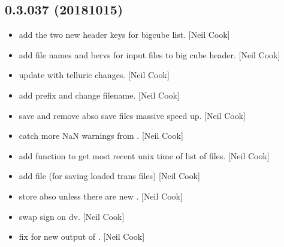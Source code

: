 \documentclass[a4paper,10pt,english]{report}
\begin{document}
\subsection{0.3.037 (2018\sphinxhyphen{}10\sphinxhyphen{}15)}
\label{\detokenize{misc/changelog:id313}}\begin{itemize}
\item {} 
 \sphinxhyphen{} add the two new header keys for bigcube list.
{[}Neil Cook{]}

\item {} 
 \sphinxhyphen{} add file names and bervs for input files to
big cube header. {[}Neil Cook{]}

\item {} 
 \sphinxhyphen{} update with telluric changes. {[}Neil Cook{]}

\item {} 
 \sphinxhyphen{} add prefix and change filename. {[}Neil Cook{]}

\item {} 
 \sphinxhyphen{} save and remove abso save files \sphinxhyphen{} massive speed up.
{[}Neil Cook{]}

\item {} 
 \sphinxhyphen{} catch more NaN warnings from . {[}Neil
Cook{]}

\item {} 
 \sphinxhyphen{} add  function to get most recent unix
time of list of files. {[}Neil Cook{]}

\item {} 
 \sphinxhyphen{} add  file (for saving loaded trans
files) {[}Neil Cook{]}

\item {} 
 \sphinxhyphen{} store abso unless there are new . {[}Neil
Cook{]}

\item {} 
 \sphinxhyphen{} swap sign on dv. {[}Neil Cook{]}

\item {} 
 \sphinxhyphen{} fix for new output of . {[}Neil Cook{]}


\end{itemize}
\end{document}
